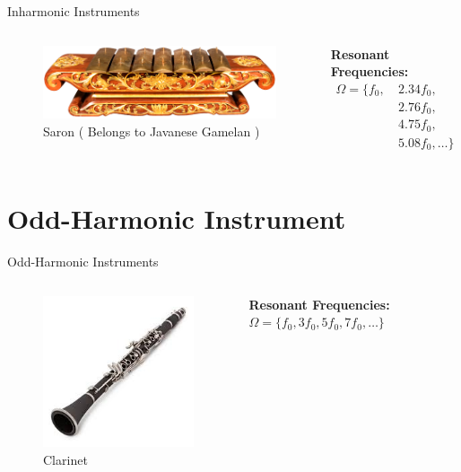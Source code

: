\documentclass{beamer}
\begin{document}
\begin{frame}{Inharmonic Instruments}
    \begin{columns}
        \begin{figure}
            \includegraphics[width=\textwidth]{saron.png}
            \caption{Saron ( Belongs to Javanese Gamelan )}
        \end{figure}
        
        \textbf{Resonant Frequencies:}
        \begin{align*}
            \Omega = \{f_0, &\ 2.34f_0, \\
                           &\ 2.76f_0, \\
                           &\ 4.75f_0, \\
                           &\ 5.08f_0, \ldots \}
        \end{align*}
    \end{columns}
\end{frame}

\section{Odd-Harmonic Instrument}
\begin{frame}{Odd-Harmonic Instruments}
    \begin{columns}
        \begin{figure}
            \includegraphics[width=.7\textwidth]{clarinet.png}
            \caption{Clarinet}
        \end{figure}
        
        \vspace{1cm}
                \textbf{Resonant Frequencies:}
            $\Omega = \{f_0, 3f_0, 5f_0, 7f_0, \ldots \}$
    \end{columns}
\end{frame}
\end{document}
